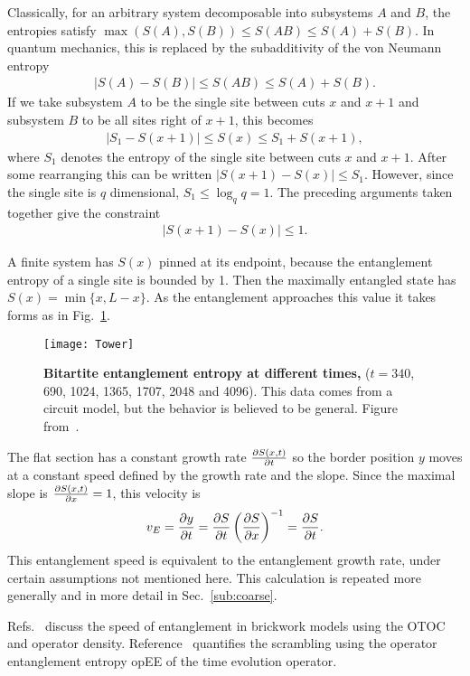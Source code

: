 Classically, for an arbitrary system decomposable into subsystems $A$ and $B$, the entropies satisfy $\max(S(A), S(B)) \leq S(AB)\leq S(A) + S(B)$. In quantum mechanics, this is replaced by the subadditivity of the von Neumann entropy 
\begin{align}
\left|S(A)-S(B)\right| \leq S(AB)\leq S(A) + S(B). \label{eqn:subadd}
\end{align}
If we take subsystem $A$ to be the single site between cuts $x$ and $x+1$ and subsystem $B$ to be all sites right of $x+1$, this becomes
\begin{align}
\left|S_1 - S(x+1)\right| \leq S(x) \leq S_1 + S(x+1),
\end{align}
where $S_1$ denotes the entropy of the single site between cuts $x$ and $x+1$. After some rearranging this can be written $\left|S(x+1) - S(x)\right| \leq S_1$. However, since the single site is $q$ dimensional, $S_1 \leq \log_q q = 1$. The preceding arguments taken together give the constraint
\begin{align}
\left|S(x+1) - S(x)\right| \leq 1. \label{eqn:offbyone}
\end{align}

A finite system has $S(x)$ pinned at its endpoint, because the entanglement entropy of a single site is bounded by 1. Then the maximally entangled state has $S(x) = \min\{x,L-x\}$. As the entanglement approaches this value it takes forms as in Fig.~\ref{fig:Tower}.
\begin{figure}
	\centering
	\texttt{[image: Tower]}
	\caption{\textbf{Bitartite entanglement entropy at different times,} ($t = 340$, 690, 1024, 1365, 1707, 2048 and 4096). This data comes from a circuit model, but the behavior is believed to be general. Figure from~\cite{Nahum2017}.}
	\label{fig:Tower}
\end{figure}
The flat section has a constant growth rate $\frac{\partial S(x,t)}{\partial t}$ so the border position $y$ moves at a constant speed defined by the growth rate and the slope. Since the maximal slope is $\frac{\partial S(x,t)}{\partial x}=1$, this velocity is
\begin{align}
v_E =  \frac{\partial y}{\partial t} = \frac{\partial S}{\partial t}\left(\frac{\partial S}{\partial x}\right)^{-1} = \frac{\partial S}{\partial t}. 
\label{eqn:vE}
\end{align}
This entanglement speed is equivalent to the entanglement growth rate, under certain assumptions not mentioned here. This calculation is repeated more generally and in more detail in Sec.~\ref{sub:coarse}.

Refs.~\cite{Keyserlingk, Jonay17, Jonay18, Nahum2017} discuss the speed of entanglement in brickwork models using the OTOC and operator density. Reference~\cite{Zhou2017} quantifies the scrambling using the operator entanglement entropy opEE of the time evolution operator.

